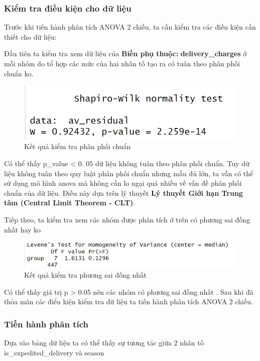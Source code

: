 \subsubsection{Kiểm tra điều kiện cho dữ liệu}
Trước khi tiến hành phân tích ANOVA 2 chiều, ta cần kiểm tra các điều kiện cần thiết cho dữ liệu:


 Đầu tiên ta kiểm tra xem dữ liệu của \textbf{Biến phụ thuộc:} \textbf{delivery\_charges} ở mỗi nhóm do tổ hợp các mức của hai nhân tố tạo ra có tuân theo phân phối chuẩn ko.
 \begin{figure}[!htbp]
    \centering
    \includegraphics[width=0.7\linewidth]{graphics/5.4.1 (2).png}
    \caption{Kết quả kiểm tra phân phối chuẩn}
\end{figure}

Có thể thấy p\_value < 0. 05 dữ liệu không tuân theo phân phối chuẩn.
Tuy dữ liệu không tuân theo quy luật phân phối chuẩn nhưng mẫu đủ lớn, ta vẫn có thể sử dụng mô hình anova mà không cần lo ngại quá nhiều về vấn đề phân phối chuẩn của dữ liệu. Điều này dựa trên lý thuyết \textbf{Lý thuyết Giới hạn Trung tâm (Central Limit Theorem - CLT)}. 


   Tiếp theo, ta kiểm tra xem các nhóm được phân tích ở trên có phương sai đồng nhất hay ko 

   \begin{figure}[!htbp]
    \centering
    \includegraphics[width=0.7\linewidth]{graphics/5.4.2.png}
    \caption{Kết quả kiểm tra phương sai đồng nhất}
\end{figure}

Có thể thấy giá trị p > 0.05 nên các nhóm có phương sai đồng nhất . 
Sau khi đã thỏa mãn các điểu kiện kiểm tra dữ liệu ta tiến hành phân tích ANOVA 2 chiều.

\subsubsection{Tiến hành phân tích}


        Dựa vào bảng dữ liệu ta có thể thấy sự tương tác giữa 2 nhân tố is\_expedited\_delivery và season

